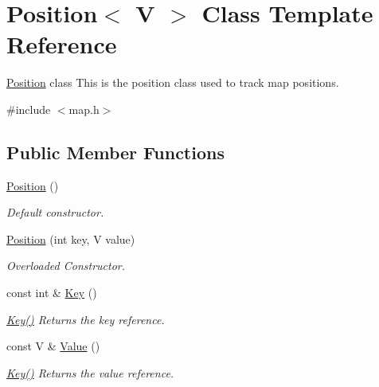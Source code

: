 \hypertarget{class_position}{}\section{Position$<$ V $>$ Class Template Reference}
\label{class_position}


\mbox{\hyperlink{class_position}{Position}} class This is the position class used to track map positions.  




{\ttfamily \#include $<$map.\+h$>$}

\subsection*{Public Member Functions}
\begin{DoxyCompactItemize}
\item 
\mbox{\label{class_position_afca6456cf593d80a62b9a69f0000041e}} 
\mbox{\hyperlink{class_position_afca6456cf593d80a62b9a69f0000041e}{Position}} ()
\begin{DoxyCompactList}\small\item\em Default constructor. \end{DoxyCompactList}\item 
\mbox{\label{class_position_a01ea320e7cec05650db9ad2f9e9ace13}} 
\mbox{\hyperlink{class_position_a01ea320e7cec05650db9ad2f9e9ace13}{Position}} (int key, V value)
\begin{DoxyCompactList}\small\item\em Overloaded Constructor. \end{DoxyCompactList}\item 
const int \& \mbox{\hyperlink{class_position_a0ba88e33f79d95d77e9761a2b71a1ae9}{Key}} ()
\begin{DoxyCompactList}\small\item\em \mbox{\hyperlink{class_position_a0ba88e33f79d95d77e9761a2b71a1ae9}{Key()}} Returns the key reference. \end{DoxyCompactList}\item 
const V \& \mbox{\hyperlink{class_position_ae6da397a8c9f770cf8a87c719fe5868b}{Value}} ()
\begin{DoxyCompactList}\small\item\em \mbox{\hyperlink{class_position_a0ba88e33f79d95d77e9761a2b71a1ae9}{Key()}} Returns the value reference. \end{DoxyCompactList}\item 

\end{DoxyCompactItemize}
